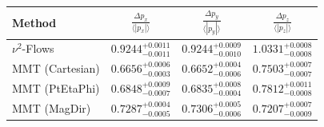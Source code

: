     \begin{tabular}{lccc}
        \toprule
        Method & $\frac{\Delta p_x}{\langle |p_x|\rangle}$ & $\frac{\Delta p_y}{\langle |p_y|\rangle}$ & $\frac{\Delta p_z}{\langle |p_z|\rangle}$ \\
        \midrule
        $\nu^2$-Flows & $0.9244^{+0.0011}_{-0.0011}$ & $0.9244^{+0.0009}_{-0.0010}$ & $1.0331^{+0.0008}_{-0.0008}$ \\
        MMT (Cartesian) & $0.6656^{+0.0006}_{-0.0003}$ & $0.6652^{+0.0004}_{-0.0006}$ & $0.7503^{+0.0007}_{-0.0007}$ \\
        MMT (PtEtaPhi) & $0.6848^{+0.0009}_{-0.0007}$ & $0.6835^{+0.0008}_{-0.0004}$ & $0.7812^{+0.0011}_{-0.0008}$ \\
        MMT (MagDir) & $0.7287^{+0.0004}_{-0.0005}$ & $0.7306^{+0.0005}_{-0.0006}$ & $0.7207^{+0.0007}_{-0.0009}$ \\
        \bottomrule
    \end{tabular}